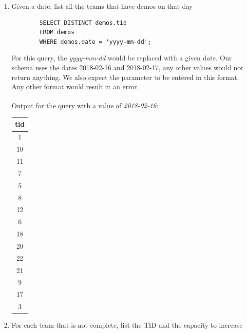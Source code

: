 \documentclass[11pt,letterpaper]{article}
\begin{document}
\begin{enumerate}
		\item Given a date, list all the teams that have demos on that day
		
		\begin{verbatim}
		SELECT DISTINCT demos.tid 
		FROM demos 
		WHERE demos.date = 'yyyy-mm-dd';
		\end{verbatim}
		For this query, the \textit{yyyy-mm-dd} would be replaced with a given date. Our schema uses the dates 2018-02-16 and 2018-02-17, any other values would not return anything. We also expect the parameter to be entered in this format. Any other format would result in an error.\\
		\\
		Output for the query with a value of \textit{2018-02-16}:
		\begin{center}
			\begin{tabular}{ | c | }
				\hline
				tid \\
				\hline
				1 \\
				10 \\
				11 \\
				7 \\
				5 \\
				8 \\
				12 \\
				6 \\
				18 \\
				20 \\
				22 \\
				21 \\
				9 \\
				17 \\
				3 \\
				\hline
			\end{tabular}
		\end{center}
		
		\item For each team that is not complete, list the TID and the capacity to increase
		

\end{enumerate}
\end{document}

